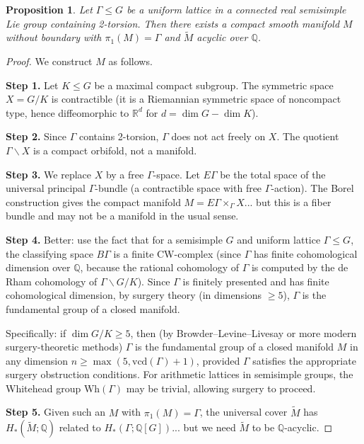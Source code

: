 \documentclass[12pt]{article}
\newtheorem{proposition}[theorem]{Proposition}
\begin{document}
\begin{proposition}
  Let $\Gamma \leq G$ be a uniform lattice in a connected real semisimple Lie group containing 2-torsion.  Then there exists a compact smooth manifold $M$ without boundary with $\pi_1(M) = \Gamma$ and $\tilde{M}$ acyclic over $\mathbb{Q}$.
\end{proposition}

\begin{proof}
We construct $M$ as follows.

\medskip
\noindent\textbf{Step 1.}  Let $K \leq G$ be a maximal compact subgroup.  The symmetric space $X = G/K$ is contractible (it is a Riemannian symmetric space of noncompact type, hence diffeomorphic to $\mathbb{R}^d$ for $d = \dim G - \dim K$).

\medskip
\noindent\textbf{Step 2.}  Since $\Gamma$ contains 2-torsion, $\Gamma$ does not act freely on $X$.  The quotient $\Gamma\backslash X$ is a compact orbifold, not a manifold.

\medskip
\noindent\textbf{Step 3.}  We replace $X$ by a free $\Gamma$-space.  Let $E\Gamma$ be the total space of the universal principal $\Gamma$-bundle (a contractible space with free $\Gamma$-action).  The Borel construction gives the compact manifold $M = E\Gamma\times_\Gamma X$... but this is a fiber bundle and may not be a manifold in the usual sense.

\medskip
\noindent\textbf{Step 4.}  Better: use the fact that for a semisimple $G$ and uniform lattice $\Gamma \leq G$, the classifying space $B\Gamma$ is a finite CW-complex (since $\Gamma$ has finite cohomological dimension over $\mathbb{Q}$, because the rational cohomology of $\Gamma$ is computed by the de Rham cohomology of $\Gamma\backslash G/K$).  Since $\Gamma$ is finitely presented and has finite cohomological dimension, by surgery theory (in dimensions $\geq 5$), $\Gamma$ is the fundamental group of a closed manifold.

Specifically: if $\dim G/K \geq 5$, then (by Browder--Levine--Livesay or more modern surgery-theoretic methods) $\Gamma$ is the fundamental group of a closed manifold $M$ in any dimension $n \geq \max(5, \mathrm{vcd}(\Gamma)+1)$, provided $\Gamma$ satisfies the appropriate surgery obstruction conditions.  For arithmetic lattices in semisimple groups, the Whitehead group $\mathrm{Wh}(\Gamma)$ may be trivial, allowing surgery to proceed.

\medskip
\noindent\textbf{Step 5.}  Given such an $M$ with $\pi_1(M)=\Gamma$, the universal cover $\tilde{M}$ has $H_*(\tilde{M};\mathbb{Q})$ related to $H_*(\Gamma;\mathbb{Q}[G])$... but we need $\tilde{M}$ to be $\mathbb{Q}$-acyclic.


\end{proof}
\end{document}
